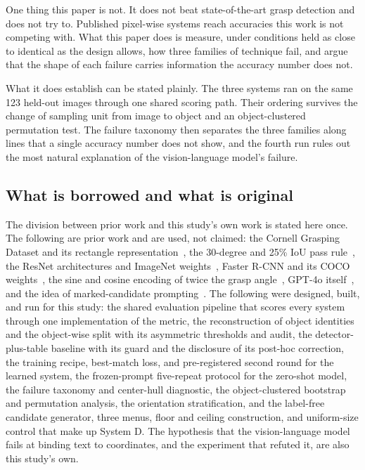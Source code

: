 \documentclass[12pt,letterpaper]{article}
\begin{document}
One thing this paper is not. It does not beat state-of-the-art grasp
detection and does not try to. Published pixel-wise systems reach
accuracies this work is not competing with. What this paper does is
measure, under conditions held as close to identical as the design
allows, how three families of technique fail, and argue that the shape
of each failure carries information the accuracy number does not.

What it does establish can be stated plainly. The three systems ran on
the same 123 held-out images through one shared scoring path. Their
ordering survives the change of sampling unit from image to object and
an object-clustered permutation test. The failure taxonomy then
separates the three families along lines that a single accuracy number
does not show, and the fourth run rules out the most natural
explanation of the vision-language model's failure.


\subsection{What is borrowed and what is original}

The division between prior work and this study's own work is stated here
once. The following
are prior work and are used, not claimed: the Cornell Grasping Dataset
and its rectangle representation~\cite{jiang2011}, the 30-degree and
25\% IoU pass rule~\cite{lenz2015}, the ResNet architectures and
ImageNet weights~\cite{he2016}, Faster R-CNN and its COCO
weights~\cite{ren2015}, the sine and cosine encoding of twice the grasp
angle~\cite{redmon2015,morrison2018}, GPT-4o itself~\cite{openai2024},
and the idea of marked-candidate prompting~\cite{yang2024}. The
following were designed, built, and run for this study: the shared
evaluation pipeline that scores every system through one implementation
of the metric, the reconstruction of object identities and the
object-wise split with its asymmetric thresholds and audit, the
detector-plus-table baseline with its guard and the disclosure of its
post-hoc correction, the training recipe, best-match loss, and
pre-registered second round for the learned system, the frozen-prompt
five-repeat protocol for the zero-shot model, the failure taxonomy and
center-hull diagnostic, the object-clustered bootstrap and permutation
analysis, the orientation stratification, and the label-free
candidate generator, three menus, floor and ceiling construction, and
uniform-size control that make up System D. The hypothesis that the
vision-language model fails at binding text to coordinates, and the
experiment that refuted it, are also this study's own.
\end{document}
